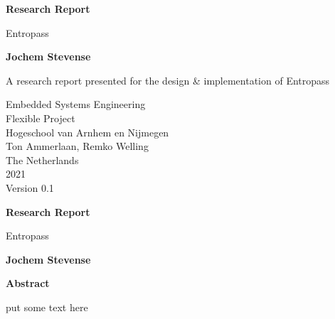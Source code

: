 \documentclass[a4paper,12pt]{article}
\begin{document}
\begin{titlepage}
  \begin{center}
    \vspace*{1cm}

    \Huge
    \textbf{Research Report}

    \vspace{0.5cm}
    \LARGE
    Entropass

    \vspace{1.5cm}

    \textbf{Jochem Stevense}

    \vfill

    A research report presented for the design \& implementation of Entropass

    \vspace{0.8cm}


    \Large
    Embedded Systems Engineering\\
    Flexible Project\\
    Hogeschool van Arnhem en Nijmegen\\
    Ton Ammerlaan, Remko Welling\\
    The Netherlands\\
    2021\\
    Version 0.1
  \end{center}
\end{titlepage}

\thispagestyle{plain}
\begin{center}
    \Large
    \textbf{Research Report}
        
    \vspace{0.4cm}
    \large
    Entropass
        
    \vspace{0.4cm}
    \textbf{Jochem Stevense}
       
    \vspace{0.9cm}
    \textbf{Abstract}
  \end{center}
  put some text here
  \newpage
  
\end{document}
